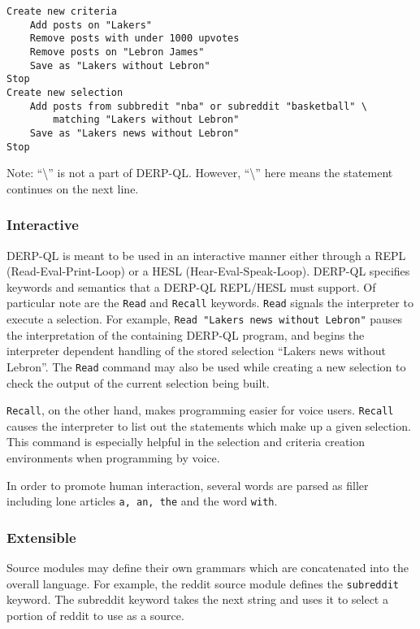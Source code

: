 \begin{lstlisting}
Create new criteria
    Add posts on "Lakers"
    Remove posts with under 1000 upvotes
    Remove posts on "Lebron James"
    Save as "Lakers without Lebron"
Stop
Create new selection
    Add posts from subbredit "nba" or subreddit "basketball" \ 
        matching "Lakers without Lebron"
    Save as "Lakers news without Lebron"
Stop
\end{lstlisting}
Note: ``\textbackslash'' is not a part of DERP-QL. However, ``\textbackslash'' here means the statement continues on the next line.

\subsubsection{Interactive}
DERP-QL is meant to be used in an interactive manner either through a REPL (Read-Eval-Print-Loop) or a HESL (Hear-Eval-Speak-Loop). DERP-QL specifies keywords and semantics that a DERP-QL REPL/HESL must support. Of particular note are the \texttt{Read} and \texttt{Recall} keywords. \texttt{Read} signals the interpreter to execute a selection. For example, \texttt{Read "Lakers news without Lebron"} pauses the interpretation of the containing DERP-QL program, and begins the interpreter dependent handling of the stored selection ``Lakers news without Lebron''. The \texttt{Read} command may also be used while creating a new selection to check the output of the current selection being built.

\texttt{Recall}, on the other hand, makes programming easier for voice users. \texttt{Recall} causes the interpreter to list out the statements which make up a given selection. This command is especially helpful in the selection and criteria creation environments when programming by voice. 

In order to promote human interaction, several words are parsed as filler including lone articles \texttt{a, an, the} and the word \texttt{with}.

\subsubsection{Extensible}\label{sssec:Extensible}
Source modules may define their own grammars which are concatenated into the overall language. For example, the reddit source module defines the \texttt{subreddit} keyword. The subreddit keyword takes the next string and uses it to select a portion of reddit to use as a source.

